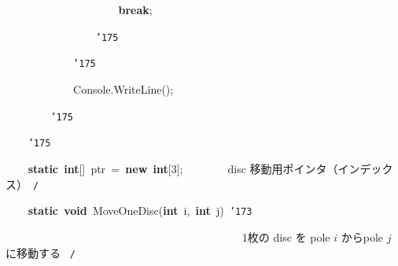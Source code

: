 \documentclass[a4paper,10pt]{article}
\def\mc{\relax}
\begin{document}
\noindent
\mbox{}{\tt\mc \ }{\tt\mc \ }{\tt\mc \ }{\tt\mc \ }{\tt\mc \ }{\tt\mc \ }{\tt\mc \ }{\tt\mc \ }{\tt\mc \ }{\tt\mc \ }{\tt\mc \ }{\tt\mc \ }{\tt\mc \ }{\tt\mc \ }{\tt\mc \ }{\tt\mc \ }{\tt\mc \ }{\tt\mc \ }{\tt\mc \ }{\tt\mc \ }\textbf{break};

\noindent
\mbox{}{\tt\mc \ }{\tt\mc \ }{\tt\mc \ }{\tt\mc \ }{\tt\mc \ }{\tt\mc \ }{\tt\mc \ }{\tt\mc \ }{\tt\mc \ }{\tt\mc \ }{\tt\mc \ }{\tt\mc \ }{\tt\mc \ }{\tt\mc \ }{\tt\mc \ }{\tt\mc \ }{\tt\char'175}

\noindent
\mbox{}{\tt\mc \ }{\tt\mc \ }{\tt\mc \ }{\tt\mc \ }{\tt\mc \ }{\tt\mc \ }{\tt\mc \ }{\tt\mc \ }{\tt\mc \ }{\tt\mc \ }{\tt\mc \ }{\tt\mc \ }{\tt\char'175}

\noindent
\mbox{}{\tt\mc \ }{\tt\mc \ }{\tt\mc \ }{\tt\mc \ }{\tt\mc \ }{\tt\mc \ }{\tt\mc \ }{\tt\mc \ }{\tt\mc \ }{\tt\mc \ }{\tt\mc \ }{\tt\mc \ }Console.WriteLine();

\noindent
\mbox{}{\tt\mc \ }{\tt\mc \ }{\tt\mc \ }{\tt\mc \ }{\tt\mc \ }{\tt\mc \ }{\tt\mc \ }{\tt\mc \ }{\tt\char'175}

\noindent
\mbox{}{\tt\mc \ }{\tt\mc \ }{\tt\mc \ }{\tt\mc \ }{\tt\char'175}

\noindent
\mbox{}\hfill

\noindent
\mbox{}{\tt\mc \ }{\tt\mc \ }{\tt\mc \ }{\tt\mc \ }\textbf{static}{\tt\mc \ }\textbf{int}[]{\tt\mc \ }ptr{\tt\mc \ }={\tt\mc \ }\textbf{new}{\tt\mc \ }\textbf{int}[3];{\tt\mc \ }{\tt\mc \ }{\tt\mc \ }{\tt\mc \ }{\tt\mc \ }{\tt\mc \ }\rm\mc {\tt /}{\tt *}\  \ disc 移動用ポインタ（インデックス）\hfill \rm\mc \ {\tt *}{\tt /}
\tt\mc 

\noindent
\mbox{}\hfill

\noindent
\mbox{}{\tt\mc \ }{\tt\mc \ }{\tt\mc \ }{\tt\mc \ }\textbf{static}{\tt\mc \ }\textbf{void}{\tt\mc \ }MoveOneDisc(\textbf{int}{\tt\mc \ }i,{\tt\mc \ }\textbf{int}{\tt\mc \ }j){\tt\mc \ }{\tt\char'173}

\noindent
\mbox{}{\tt\mc \ }{\tt\mc \ }{\tt\mc \ }{\tt\mc \ }{\tt\mc \ }{\tt\mc \ }{\tt\mc \ }{\tt\mc \ }{\tt\mc \ }{\tt\mc \ }{\tt\mc \ }{\tt\mc \ }{\tt\mc \ }{\tt\mc \ }{\tt\mc \ }{\tt\mc \ }{\tt\mc \ }{\tt\mc \ }{\tt\mc \ }{\tt\mc \ }{\tt\mc \ }{\tt\mc \ }{\tt\mc \ }{\tt\mc \ }{\tt\mc \ }{\tt\mc \ }{\tt\mc \ }{\tt\mc \ }{\tt\mc \ }{\tt\mc \ }{\tt\mc \ }{\tt\mc \ }{\tt\mc \ }{\tt\mc \ }{\tt\mc \ }{\tt\mc \ }{\tt\mc \ }{\tt\mc \ }{\tt\mc \ }{\tt\mc \ }\rm\mc {\tt /}{\tt *}\  \ 1枚の disc を pole $i$ からpole $j$ に移動する \hfill \rm\mc \ {\tt *}{\tt /}
\tt\mc 
\end{document}
